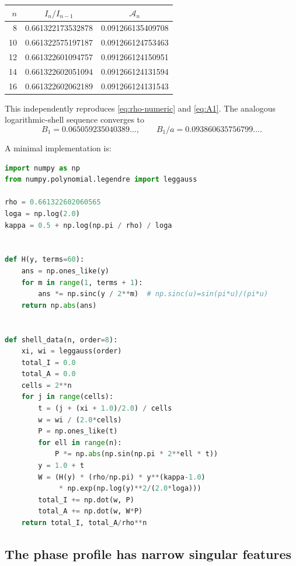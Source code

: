 \documentclass[11pt,oneside]{article}
\theoremstyle{definition}
\theoremstyle{remark}
\begin{document}
\begin{center}
\begin{tabular}{@{}rcc@{}}
\toprule
$n$ & $I_n/I_{n-1}$ & $\mathcal A_n$\\
\midrule
8  & 0.661322173532878 & 0.091266135409708\\
10 & 0.661322575197187 & 0.091266124753463\\
12 & 0.661322601094757 & 0.091266124150951\\
14 & 0.661322602051094 & 0.091266124131594\\
16 & 0.661322602062189 & 0.091266124131543\\
\bottomrule
\end{tabular}
\end{center}
This independently reproduces
\eqref{eq:rho-numeric} and \eqref{eq:A1}.  The analogous logarithmic-shell
sequence converges to
\begin{equation}
 B_1=0.065059235040389\ldots,
 \qquad B_1/a=0.093860635756799\ldots .
\end{equation}

A minimal implementation is:
\begin{lstlisting}[style=code,language=Python]
import numpy as np
from numpy.polynomial.legendre import leggauss

rho = 0.661322602060565
loga = np.log(2.0)
kappa = 0.5 + np.log(np.pi / rho) / loga


def H(y, terms=60):
    ans = np.ones_like(y)
    for m in range(1, terms + 1):
        ans *= np.sinc(y / 2**m)  # np.sinc(u)=sin(pi*u)/(pi*u)
    return np.abs(ans)


def shell_data(n, order=8):
    xi, wi = leggauss(order)
    total_I = 0.0
    total_A = 0.0
    cells = 2**n
    for j in range(cells):
        t = (j + (xi + 1.0)/2.0) / cells
        w = wi / (2.0*cells)
        P = np.ones_like(t)
        for ell in range(n):
            P *= np.abs(np.sin(np.pi * 2**ell * t))
        y = 1.0 + t
        W = (H(y) * (rho/np.pi) * y**(kappa-1.0)
             * np.exp(np.log(y)**2/(2.0*loga)))
        total_I += np.dot(w, P)
        total_A += np.dot(w, W*P)
    return total_I, total_A/rho**n
\end{lstlisting}

\subsection{The phase profile has narrow singular features}
\end{document}
